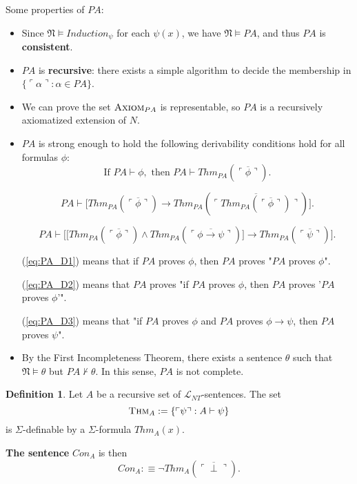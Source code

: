 \documentclass[11pt,letterpaper]{book}
\theoremstyle{definition}
\newtheorem{definition}{Definition}[section]
\begin{document}
Some properties of $PA$:
\begin{itemize}
\item{Since $\mathfrak{N} \models Induction_{\psi} $ for each $\psi (x)$, we have $\mathfrak{N} \models PA$, and thus $PA$ is \textbf{consistent}.}
\item{$PA$ is \textbf{recursive}: there exists a simple algorithm to decide the membership in $\{\ulcorner \alpha \urcorner : \alpha \in PA   \}$.}
\item{We can prove the set $\text{\textsc{Axiom}}_{PA}$ is representable, so $PA$ is a recursively axiomatized extension of $N$.}
\item{$PA$ is strong enough to hold the following derivability conditions hold for all formulas $\phi$:
\begin{equation}
\text{If } PA \vdash \phi, \text{ then } PA \vdash Thm_{PA} (\overline{\ulcorner \phi \urcorner}). \tag{D1} \label{eq:PA_D1}
\end{equation}

\begin{equation}
PA \vdash \bigg[ Thm_{PA} (\overline{\ulcorner \phi \urcorner}) \rightarrow Thm_{PA} ( \overline{\ulcorner Thm_{PA} (\overline{\ulcorner \phi \urcorner}) \urcorner} )  \bigg] .
\tag{D2} \label{eq:PA_D2}
\end{equation}

\begin{equation}
PA \vdash \bigg[ \big[ Thm_{PA} (\overline{\ulcorner \phi \urcorner}) \land Thm_{PA} ( \overline{\ulcorner \phi \rightarrow \psi \urcorner} )  \big] \rightarrow Thm_{PA}  (\overline{\ulcorner \psi \urcorner}) \bigg] .
\tag{D3} \label{eq:PA_D3}
\end{equation}

(\ref{eq:PA_D1}) means that if $PA$ proves $\phi$, then $PA$ proves "$PA$ proves $\phi$".

(\ref{eq:PA_D2}) means that $PA$ proves "if $PA$ proves $\phi$, then $PA$ proves '$PA$ proves $\phi$'".

(\ref{eq:PA_D3}) means that "if $PA$ proves $\phi$ and $PA$ proves $\phi \rightarrow \psi$, then $PA$ proves $\psi$".

}
\item{By the First Incompleteness Theorem, there exists a sentence $\theta $ such that $\mathfrak{N} \models \theta$ but $PA \not \vdash \theta $. In this sense, $PA$ is not complete.}
\end{itemize}

\begin{definition}
\label{def:con_pa}
Let $A$ be a recursive set of $\mathcal{L}_{NT}$-sentences. The set
$$\text{\textsc{Thm}}_A := \{ \ulcorner \psi \urcorner : A \vdash \psi \} $$
is $\Sigma$-definable by a $\Sigma$-formula $Thm_A (x)$.

\textbf{The sentence} $Con_{A}$ is then
$$ Con_A :\equiv \lnot Thm_A (\overline{\ulcorner \perp \urcorner}) . $$
\end{definition}
\end{document}
